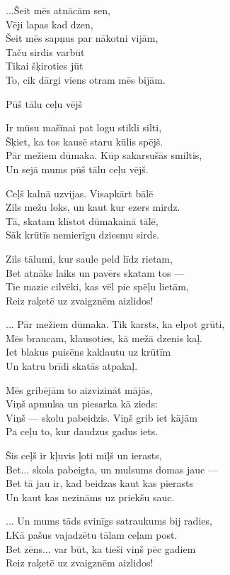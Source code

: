 \documentclass[14pt]{extarticle}
\begin{document}
{...Šeit mēs atnācām sen,\\
Vēji lapas kad dzen,\\
Šeit mēs sapņus par nākotni vijām,\\
Taču sirdis varbūt\\
Tikai šķiroties jūt\\
To, cik dārgi viens otram mēs bijām.


\newpage

{\large \sc Pūš tālu ceļu vējš}

Ir mūsu mašīnai pat logu stikli silti,\\
Šķiet, ka tos kausē staru kūlis spējš.\\
Pār mežiem dūmaka. Kūp sakarsušās smiltis,\\
Un sejā mums pūš tālu ceļu vējš.

Ceļš kalnā uzvijas. Visapkārt bālē\\
Zils mežu loks, un kaut kur ezers mirdz.\\
Tā, skatam klīstot dūmakainā tālē,\\
Sāk krūtīs nemierīgu dziesmu sirds.

Zils tālumi, kur saule peld līdz rietam,\\
Bet atnāks laiks un pavērs skatam tos ---\\
Tie mazie cilvēki, kas vēl pie spēļu lietām,\\
Reiz raķetē uz zvaigznēm aizlidos!

... Pār mežiem dūmaka. Tik karsts, ka elpot grūti,\\
Mēs braucam, klausoties, kā mežā dzenis kaļ.\\
Iet blakus puisēns kaklautu uz krūtīm\\
Un katru brīdi skatās atpakaļ.

Mēs gribējām to aizvizināt mājās,\\
Viņš apmulsa un piesarka kā zieds:\\
Viņš --- skolu pabeidzis. Viņš grib iet kājām\\
Pa ceļu to, kur daudzus gadus iets.

Šis ceļš ir kļuvis ļoti mīļš un ierasts,\\
Bet... skola pabeigta, un mulsums domas jauc ---\\
Bet tā jau ir, kad beidzas kaut kas pierasts\\
Un kaut kas nezināms uz priekšu sauc.

... Un mums tāds svinīgs satraukums bij radies,\\
LKā pašus vajadzētu tālam ceļam post.\\
Bet zēns... var būt, ka tieši viņš pēc gadiem\\
Reiz raķetē uz zvaigznēm aizlidos!

}
\end{document}
